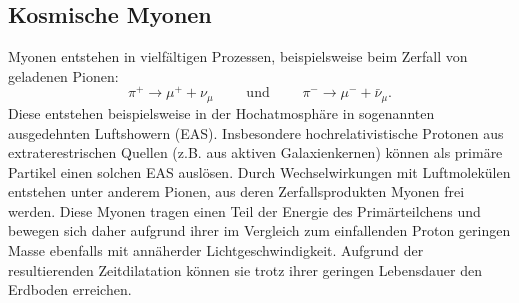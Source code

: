   \subsection{Kosmische Myonen}
  Myonen entstehen in vielfältigen Prozessen, beispielsweise beim Zerfall von geladenen
  Pionen:
  \begin{equation*}
    \pi^+ \to \mu^+ + \nu_{\mu} \qquad \text{ und } \qquad \pi^- \to \mu^- + \bar{\nu}_{\mu} .
  \end{equation*}
  Diese entstehen beispielsweise in der Hochatmosphäre in sogenannten ausgedehnten
  Luftshowern (EAS). Insbesondere hochrelativistische Protonen aus extraterestrischen
  Quellen (z.B. aus aktiven Galaxienkernen) können als primäre
  Partikel einen solchen EAS auslösen. Durch Wechselwirkungen mit Luftmolekülen
  entstehen unter anderem Pionen, aus deren Zerfallsprodukten Myonen frei werden.
  Diese Myonen tragen einen Teil der Energie des Primärteilchens und bewegen sich
  daher aufgrund ihrer im Vergleich zum einfallenden Proton geringen Masse ebenfalls mit
  annäherder Lichtgeschwindigkeit. Aufgrund der resultierenden Zeitdilatation
  können sie trotz ihrer geringen Lebensdauer den Erdboden erreichen.
